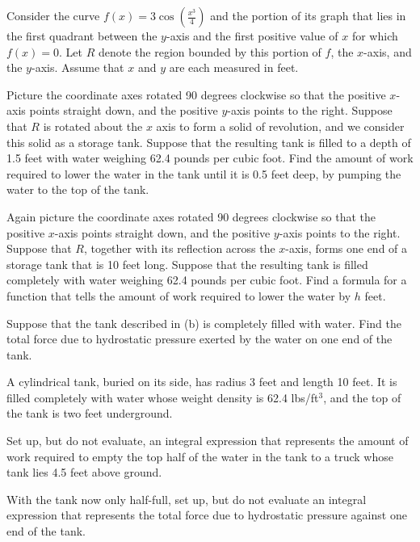 \begin{exercises} 
  \item Consider the curve $f(x) = 3 \cos(\frac{x^3}{4})$ and the portion of its graph that lies in the first quadrant between the $y$-axis and the first positive value of $x$ for which $f(x) = 0$.  Let  $R$ denote the region bounded by this portion of $f$, the $x$-axis, and the $y$-axis.  Assume that $x$ and $y$ are each measured in feet.
  
  	\ba
		\item Picture the coordinate axes rotated 90 degrees clockwise so that the positive $x$-axis points straight down, and the positive $y$-axis points to the right.  Suppose that $R$ is rotated about the $x$ axis to form a solid of revolution, and we consider this solid as a storage tank.  Suppose that the resulting tank is filled to a depth of 1.5 feet with water weighing 62.4 pounds per cubic foot.  Find the amount of work required to lower the water in the tank until it is 0.5 feet deep, by pumping the water to the top of the tank.
		\item Again picture the coordinate axes rotated 90 degrees clockwise so that the positive $x$-axis points straight down, and the positive $y$-axis points to the right.  Suppose that $R$, together with its reflection across the $x$-axis, forms one end of a storage tank that is 10 feet long.  Suppose that the resulting tank is filled completely with water weighing 62.4 pounds per cubic foot.  Find a formula for a function that tells the amount of work required to lower the water by $h$ feet.
		\item Suppose that the tank described in (b) is completely filled with water.  Find the total force due to hydrostatic pressure exerted by the water on one end of the tank.
	\ea 
  
  \item A cylindrical tank, buried on its side, has radius 3 feet and length 10 feet.  It is filled completely with water whose weight density is 62.4 lbs/ft$^3$, and the top of the tank is two feet underground.

	\ba
		\item Set up, but do not evaluate, an integral expression that represents the amount of work required to empty the top half of the water in the tank to a truck whose tank lies 4.5 feet above ground.
  
		\item With the tank now only half-full, set up, but do not evaluate an integral expression that represents the total force due to hydrostatic pressure against one end of the tank.
	\ea

  
\end{exercises}
\afterexercises
